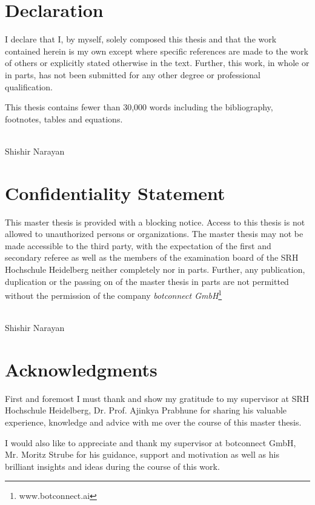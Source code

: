 \documentclass[12pt]{extarticle}
\numberwithin{equation}{section}
\begin{document}
	\setcounter{page}{1}
	\section*{Declaration}
I declare that I, by myself, solely composed this thesis and that the work contained herein is my own except where specific references are made to the work of others or explicitly stated otherwise in the text. Further, this work, in whole or in parts, has not been submitted for any other degree or professional qualification.
	
	This thesis contains fewer than 30,000 words including the bibliography, footnotes, tables and equations.
	\\\\
	\begin{flushright}
		Shishir Narayan\\
		\date{\today}
	\end{flushright}
	\clearpage
	\section*{Confidentiality Statement}
	This master thesis is provided with a blocking notice. Access to this thesis is not allowed to unauthorized persons or organizations. The master thesis may not be made accessible to the third party, with the expectation of the first and secondary referee as well as the members of the examination board of the SRH Hochschule Heidelberg neither completely nor in parts.
	Further, any publication, duplication or the passing on of the master thesis in parts are not permitted without the permission of the company \textit{botconnect GmbH}\footnote{www.botconnect.ai}
	\\\\
	\begin{flushright}
		Shishir Narayan\\
		\date{\today}
	\end{flushright}
	\clearpage
	\section*{Acknowledgments}
First and foremost I must thank and show my gratitude to my supervisor at SRH Hochschule Heidelberg, Dr. Prof. Ajinkya Prabhune for sharing his valuable experience, knowledge and advice with me over the course of this master thesis. 

I would also like to appreciate and thank my supervisor at botconnect GmbH, Mr. Moritz Strube for his guidance, support and motivation as well as his brilliant insights and ideas during the course of this work.
\end{document}
